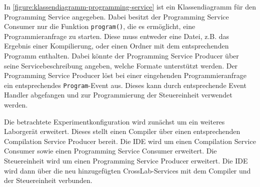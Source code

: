 In \autoref{figure:klassendiagramm-programming-service} ist ein Klassendiagramm für den Programming Service angegeben. Dabei besitzt der Programming Service Consumer nur die Funktion \texttt{program()}, die es ermöglicht, eine Programmieranfrage zu starten. Diese muss entweder eine Datei, z.B. das Ergebnis einer Kompilierung, oder einen Ordner mit dem entsprechenden Programm enthalten. Dabei könnte der Programming Service Producer über seine Servicebeschreibung angeben, welche Formate unterstützt werden. Der Programming Service Producer löst bei einer eingehenden Programmieranfrage ein entsprechendes \texttt{Program}-Event aus. Dieses kann durch entsprechende Event Handler abgefangen und zur Programmierung der Steuereinheit verwendet werden.

Die betrachtete Experimentkonfiguration wird zunächst um ein weiteres Laborgerät erweitert. Dieses stellt einen Compiler über einen entsprechenden Compilation Service Producer bereit. Die IDE wird um einen Compilation Service Consumer sowie einen Programming Service Consumer erweitert. Die Steuereinheit wird um einen Programming Service Producer erweitert. Die IDE wird dann über die neu hinzugefügten CrossLab-Services mit dem Compiler und der Steuereinheit verbunden.